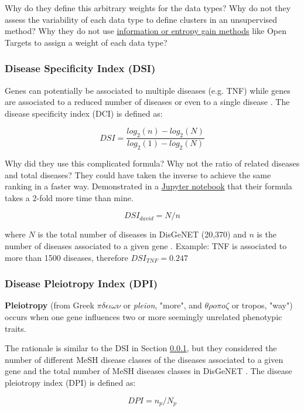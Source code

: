Why do they define this arbitrary weights for the data types? Why do not they assess the variability of each data type to define clusters in an unsupervised method? Why they do not use \href{https://goo.gl/k6vEBj}{information or entropy gain methods} like Open Targets \cite{ferrero2017} to assign a weight of each data type?

\subsubsection{Disease Specificity Index (DSI)}
\label{subsubsec:dsi}
Genes can potentially be associated to multiple diseases (e.g. TNF) while genes are associated to a reduced number of diseases or even to a single disease \cite{DisGeNET2015}. The disease specificity index (DCI) is defined as:

$$ DSI = \frac{log_2(n) - log_2(N)}{log_2(1) - log_2(N)} $$

Why did they use this complicated formula? Why not the ratio of related diseases and total diseases? They could have taken the inverse to achieve the same ranking in a faster way. Demonstrated in a \href{https://goo.gl/zsegji}{Jupyter notebook} that their formula takes a 2-fold more time than mine.

$$ DSI_{david} = N / n $$

where $N$ is the total number of diseases in DisGeNET (20,370) and $n$ is the number of diseases associated to a given gene \cite{DisGeNET2015}. Example: TNF is associated to more than 1500 diseases, therefore $ DSI_{TNF} = 0.247 $

\subsubsection{Disease Pleiotropy Index (DPI)}
\begin{shadequote}
\textbf{Pleiotropy} (from Greek $\pi\delta\epsilon\iota\omega\nu$ or \emph{pleion}, "more", and $\theta\rho o\pi o\zeta$ or tropos, "way") occurs when one gene influences two or more seemingly unrelated phenotypic traits.
\end{shadequote}
The rationale is similar to the DSI in Section \ref{subsubsec:dsi}, but they considered the number of different MeSH disease classes of the diseases associated to a given gene and the total number of MeSH diseases classes in DisGeNET \cite{DisGeNET2015}. The disease pleiotropy index (DPI) is defined as:

$$ DPI = n_p / N_p $$

